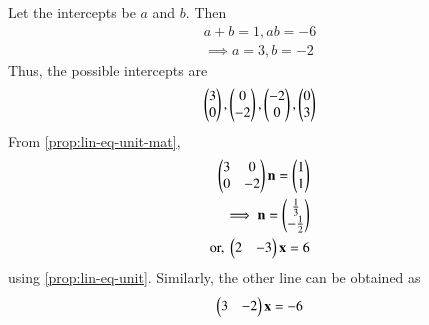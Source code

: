 Let the intercepts be $a$ and  $b$. Then
\begin{align}
a+b=1,
ab=-6 \label{eq:11/10/4/32a}
\\
\implies  a = 3, b = -2
\end{align}
Thus, the possible 
intercepts are
\begin{align}
\begin{pmatrix}3\\0\end{pmatrix}, \begin{pmatrix}0\\-2\end{pmatrix},
\begin{pmatrix}-2\\0\end{pmatrix}, \begin{pmatrix}0\\3\end{pmatrix}
\end{align}
From
		\eqref{prop:lin-eq-unit-mat},
\begin{align}
	\begin{pmatrix}3 & 0 \\ 0 &-2\end{pmatrix}\mathbf{n} = \begin{pmatrix}1 \\ 1\end{pmatrix}
	\\
	\implies \mathbf{n} = \begin{pmatrix}\frac{1}{3} \\ -\frac{1}{2}\end{pmatrix}
	\\
	\text{or, } \begin{pmatrix}2 & -3\end{pmatrix}\mathbf{x} = 6
\end{align}
using		\eqref{prop:lin-eq-unit}.
Similarly, the other line can be obtained
as
\begin{align}
	\begin{pmatrix} 3 & -2 \end{pmatrix}  \mathbf{x}  = -6        
\end{align}

